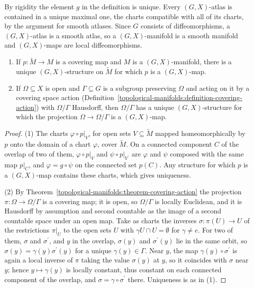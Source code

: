 By rigidity the element $g$ in the definition is unique. Every $(G, X)$-atlas is contained in a unique maximal one, the charts compatible with all of its charts, by the argument for smooth atlases. Since $G$
consists of diffeomorphisms, a $(G, X)$-atlas is a smooth atlas, so a $(G, X)$-manifold is a smooth manifold and $(G, X)$-maps are local diffeomorphisms.

\begin{lemma}\label{riemannian-geometry:lemma-gx-constructions}
\begin{enumerate}
\item If $p \colon \widetilde{M} \to M$ is a covering map and $M$ is a $(G, X)$-manifold, there is a unique $(G, X)$-structure on $\widetilde{M}$ for which $p$ is a $(G, X)$-map.
\item If $\Omega \subseteq X$ is open and $\Gamma \subseteq G$ is a subgroup preserving $\Omega$ and acting on it by a covering space action (Definition~\ref{topological-manifolds:definition-covering-action}) with $\Omega/\Gamma$ Hausdorff, then
$\Omega/\Gamma$ has a unique $(G, X)$-structure for which the projection $\Omega \to \Omega/\Gamma$ is a $(G, X)$-map.
\end{enumerate}
\end{lemma}

\begin{proof}
(1) The charts $\varphi \circ p|_V$, for open sets $V \subseteq \widetilde{M}$ mapped homeomorphically by $p$ onto the domain of a chart $\varphi$, cover $\widetilde{M}$. On a connected component $C$ of the overlap of two of them,
$\varphi \circ p|_V$ and $\psi \circ p|_{V^{\prime}}$ are $\varphi$ and $\psi$ composed with the same map $p|_C$, and $\varphi = g \circ \psi$ on the connected set $p(C)$. Any structure for which $p$ is a $(G, X)$-map contains
these charts, which gives uniqueness.

(2) By Theorem~\ref{topological-manifolds:theorem-covering-action} the projection $\pi \colon \Omega \to \Omega/\Gamma$ is a covering map; it is open, so $\Omega/\Gamma$ is locally Euclidean, and it is Hausdorff by assumption and second
countable as the image of a second countable space under an open map. Take as charts the inverses $\sigma \colon \pi(U) \to U$ of the restrictions $\pi|_U$ to the open sets $U$ with $\gamma U \cap U = \emptyset$ for $\gamma \neq e$.
For two of them, $\sigma$ and $\sigma^{\prime}$, and $y$ in the overlap, $\sigma(y)$ and $\sigma^{\prime}(y)$ lie in the same orbit, so $\sigma(y) = \gamma(y)\sigma^{\prime}(y)$ for a unique $\gamma(y) \in \Gamma$. Near $y$, the map
$\gamma(y) \circ \sigma^{\prime}$ is again a local inverse of $\pi$ taking the value $\sigma(y)$ at $y$, so it coincides with $\sigma$ near $y$; hence $y \mapsto \gamma(y)$ is locally constant, thus constant on each connected component
of the overlap, and $\sigma = \gamma \circ \sigma^{\prime}$ there. Uniqueness is as in (1).
\end{proof}

